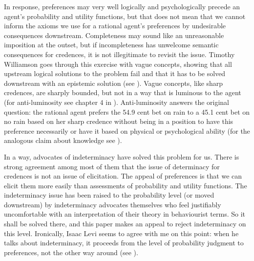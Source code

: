 In response, preferences may very well logically and
psychologically precede an agent's probability and
utility functions, but that does not mean that we
cannot inform the axioms we use for a rational agent's
preferences by undesirable consequences downstream.
Completeness may sound like an unreasonable imposition
at the outset, but if incompleteness has unwelcome
semantic consequences for credences, it is not
illegitimate to revisit the issue. Timothy Williamson
goes through this exercise with vague concepts, showing
that all upstream logical solutions to the problem fail
and that it has to be solved downstream with an
epistemic solution (see ).
Vague concepts, like sharp credences, are sharply
bounded, but not in a way that is luminous to the agent
(for anti-luminosity see chapter 4 in
). Anti-luminosity answers the
original question: the rational agent prefers the 54.9
cent bet on rain to a 45.1 cent bet on no rain based on
her sharp credence without being in a position to have
this preference necessarily or have it based on
physical or psychological ability (for the analogous
claim about knowledge see ).

In a way, advocates of indeterminacy have solved this
problem for us. There is strong agreement among most of
them that the issue of determinacy for credences is not
an issue of elicitation. The appeal of preferences is
that we can elicit them more easily than assessments of
probability and utility functions. The indeterminacy
issue has been raised to the probability level (or
moved downstream) by indeterminacy advocates themselves
who feel justifiably uncomfortable with an
interpretation of their theory in behaviourist terms.
So it shall be solved there, and this paper makes an
appeal to reject indeterminacy on this level.
Ironically, Isaac Levi seems to agree with me on this
point: when he talks about indeterminacy, it proceeds
from the level of probability judgment to preferences,
not the other way around (see ).


